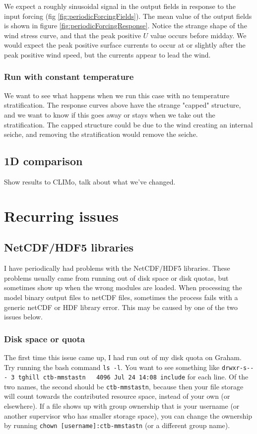 \documentclass[11pt]{article}
\begin{document}
We expect a roughly sinusoidal signal in the output fields in response to the input forcing (fig \ref{fig:periodicForcingFields}). The mean value of the output fields is shown in figure \ref{fig:periodicForcingResponse}. Notice the strange shape of the wind stress curve, and that the peak positive $U$ value occurs before midday. We would expect the peak positive surface currents to occur at or slightly after the peak positive wind speed, but the currents appear to lead the wind.

\subsubsection{Run with constant temperature}
We want to see what happens when we run this case with no temperature stratification. The response curves above have the strange "capped" structure, and we want to know if this goes away or stays when we take out the stratification. The capped structure could be due to the wind creating an internal seiche, and removing the stratification would remove the seiche.

\subsection{1D comparison}
Show results to CLIMo, talk about what we've changed.



\section{Recurring issues}

\subsection{NetCDF/HDF5 libraries}
I have periodically had problems with the NetCDF/HDF5 libraries. These problems usually came from running out of disk space or disk quotas, but sometimes show up when the wrong modules are loaded. When processing the model binary output files to netCDF files, sometimes the process fails with a generic netCDF or HDF library error. This may be caused by one of the two issues below.

\subsubsection{Disk space or quota}
The first time this issue came up, I had run out of my disk quota on Graham. Try running the bash command \verb|ls -l|. You want to see something like \verb|drwxr-s--- 3 tghill ctb-mmstastn   4096 Jul 24 14:08 include| for each line. Of the two names, the second should be \verb|ctb-mmstastn|, because then your file storage will count towards the contributed resource space, instead of your own (or elsewhere). If a file shows up with group ownership that is your username (or another supervisor who has smaller storage space), you can change the ownership by running \verb|chown [username]:ctb-mmstastn| (or a different group name).
\end{document}
